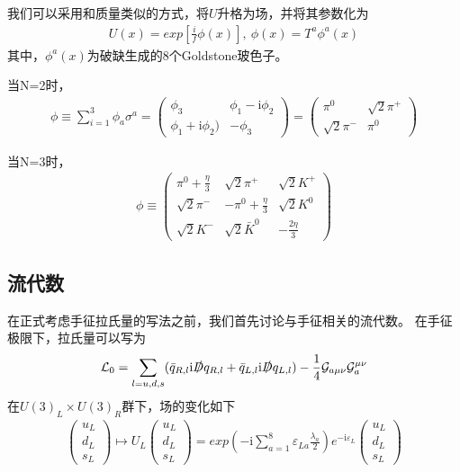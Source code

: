 \documentclass[aps,tightenlines,16pt]{ctexart}
\numberwithin{equation}{section}
\newcommand{\mL}{\mathcal{L}}
\begin{document}
我们可以采用和质量类似的方式，将$U$升格为场，并将其参数化为
\begin{align}
   U(x)=exp[\frac{i}{f} \phi(x)],\ \phi(x)=T^a \phi^a(x)
\end{align}
其中，$\phi^a(x)$为破缺生成的8个Goldstone玻色子。

当N=2时，
\begin{align}
   \phi \equiv \sum_{i=1}^{3} \phi_a \sigma^a =
   \begin{pmatrix}
      \phi_3 & \phi_1 - \mbox{i} \phi_2 \\
      \phi_1 + \mbox{i} \phi_2) & -\phi_3
   \end{pmatrix}
   =\begin{pmatrix}
      \pi^0 & \sqrt{2}\pi^+ \\
      \sqrt{2}\pi^- & \pi^0
   \end{pmatrix}
\end{align}

当N=3时，
\begin{align}
   \phi \equiv \begin{pmatrix}
      \pi^0+\frac{\eta}{3} & \sqrt{2}\pi^+ & \sqrt{2}K^+ \\
      \sqrt{2}\pi^- & -\pi^0+\frac{\eta}{3} &\sqrt{2}K^0 \\
      \sqrt{2}K^- & \sqrt{2}\bar{K}^0 & -\frac{2\eta}{3}
   \end{pmatrix}
\end{align}

\subsection{流代数}
   在正式考虑手征拉氏量的写法之前，我们首先讨论与手征相关的流代数。
在手征极限下，拉氏量可以写为
\begin{align}\label{L_QCD}
   \mL_{0} = \sum_{l=u,d,s} (\bar{q}_{R,l} \mbox{i}\slashed{D} q_{R,l} + \bar{q}_{L,l} \mbox{i}\slashed{D} q_{L,l}) -\frac{1}{4}\mathcal{G}_{a\mu\nu}\mathcal{G}_a^{\mu\nu}
\end{align}
在$U(3)_L \times U(3)_R$群下，场的变化如下
\begin{align*}
   \begin{pmatrix}
      u_L\\
      d_L\\
      s_L
   \end{pmatrix}
   \mapsto U_L
   \begin{pmatrix}
      u_L\\
      d_L\\
      s_L
   \end{pmatrix}
   =
   exp\left(-\mbox{i}\sum_{a=1}^{8}\varepsilon_{La}\frac{\lambda_a}{2}\right)
   e^{-\mbox{i}\varepsilon_L}
   \begin{pmatrix}
      u_L\\
      d_L\\
      s_L
   \end{pmatrix}
\end{align*}
\end{document}
